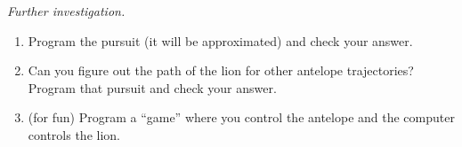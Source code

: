 \vfill

\emph{Further investigation. } 

\begin{enumerate}[label=\emph{\arabic*.}]
\item Program the pursuit (it will be approximated) and check your answer.
\item Can you figure out the path of the lion for other antelope trajectories? 
Program that pursuit and check your answer.

\item (for fun) Program a ``game'' where you control the antelope and the computer controls the lion.
\end{enumerate}






%

\begin{noexercises}
\end{noexercises}